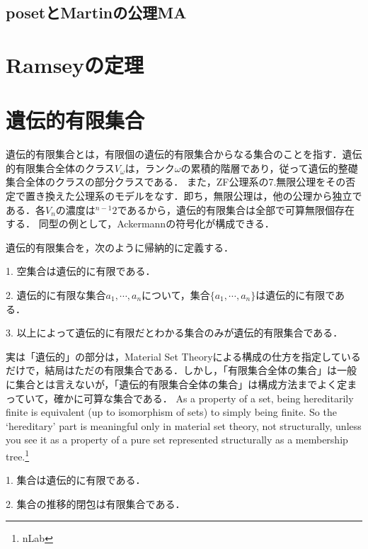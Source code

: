\documentclass[uplatex, 12pt, dvipdfmx]{jsreport}
\begin{document}
\subsection{posetとMartinの公理MA}

\section{Ramseyの定理}

\section{遺伝的有限集合}

遺伝的有限集合とは，有限個の遺伝的有限集合からなる集合のことを指す．遺伝的有限集合全体のクラス$V_\omega$は，ランク$\omega$の累積的階層であり，従って遺伝的整礎集合全体のクラスの部分クラスである．
また，ZF公理系の7.無限公理をその否定で置き換えた公理系のモデルをなす．即ち，無限公理は，他の公理から独立である．各$V_n$の濃度は${}^{n-1}2$であるから，遺伝的有限集合は全部で可算無限個存在する．
同型の例として，Ackermannの符号化が構成できる．

\begin{definition}
    遺伝的有限集合を，次のように帰納的に定義する．

    1. 空集合は遺伝的に有限である．

    2. 遺伝的に有限な集合$a_1,\cdots,a_n$について，集合$\{a_1,\cdots,a_n\}$は遺伝的に有限である．

    3. 以上によって遺伝的に有限だとわかる集合のみが遺伝的有限集合である．
\end{definition}
\begin{remark}
    実は「遺伝的」の部分は，Material Set Theoryによる構成の仕方を指定しているだけで，結局はただの有限集合である．しかし，「有限集合全体の集合」は一般に集合とは言えないが，「遺伝的有限集合全体の集合」は構成方法までよく定まっていて，確かに可算な集合である．
    As a property of a set, being hereditarily finite is equivalent (up to isomorphism of sets) to simply being finite. So the ‘hereditary’ part is meaningful only in material set theory, not structurally, unless you see it as a property of a pure set represented structurally as a membership tree.\footnote{nLab}
\end{remark}

\begin{proposition}
    1. 集合は遺伝的に有限である．

    2. 集合の推移的閉包は有限集合である．
\end{proposition}
\end{document}
